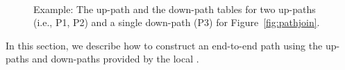 \begin{figure}[ht]
\centering
\mbox{~\label{fig:uppath-table}\quad
{}~\label{fig:downpath-table}}
\caption{Example: The up-path and the down-path tables for two up-paths (i.e., P1, P2) and a single down-path (P3) for Figure~\ref{fig:pathjoin}.}
\end{figure}

In this section, we describe how to construct an end-to-end path using the up-paths and down-paths provided by the local \PS.

